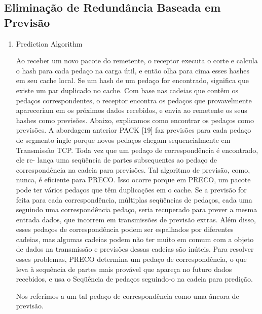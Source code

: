 \documentclass[12pt]{article}
\begin{document}
	\subsection{ 
		Eliminação de Redundância Baseada em Previsão}
	\begin{enumerate}
	\item 	Prediction Algorithm
	
	Ao receber um novo pacote
	do remetente, o receptor executa o corte e calcula
	o hash para cada pedaço na carga útil, e então olha para cima
	esses hashes em seu cache local. Se um hash de um pedaço for
	encontrado, significa que existe um par duplicado no cache.
	Com base nas cadeias que contêm os pedaços correspondentes, o
	receptor encontra os pedaços que provavelmente apareceriam em
	os próximos dados recebidos, e envia ao remetente os seus hashes
	como previsões.
	Abaixo, explicamos como encontrar os pedaços como previsões.
	A abordagem anterior PACK [19] faz previsões para cada pedaço de segmento ingle porque novos pedaços chegam sequencialmente em
	Transmissão TCP. Toda vez que um pedaço de correspondência é encontrado, ele re-
	lança uma seqüência de partes subsequentes ao pedaço de correspondência
	na cadeia para previsões. Tal algoritmo de previsão, como,
	nunca, é eficiente para PRECO. Isso ocorre porque em PRECO,
	um pacote pode ter vários pedaços que têm duplicações em
	o cache. Se a previsão for feita para cada correspondência,
	múltiplas seqüências de pedaços, cada uma seguindo uma correspondência
	pedaço, seria recuperado para prever a mesma entrada
	dados, que incorrem em transmissões de previsão extras. Além disso,
	esses pedaços de correspondência podem ser espalhados por diferentes cadeias,
	mas algumas cadeias podem não ter muito em comum com a
	objeto de dados na transmissão e previsões dessas cadeias
	são inúteis. Para resolver esses problemas, PRECO determina um
	pedaço de correspondência, o que leva à sequência de partes mais
	provável que apareça no futuro dados recebidos, e usa o
	Seqüência de pedaços seguindo-o na cadeia para predição.
	
	Nos referimos a um tal pedaço de correspondência como uma âncora de previsão.
	

\end{enumerate}
\end{document}

